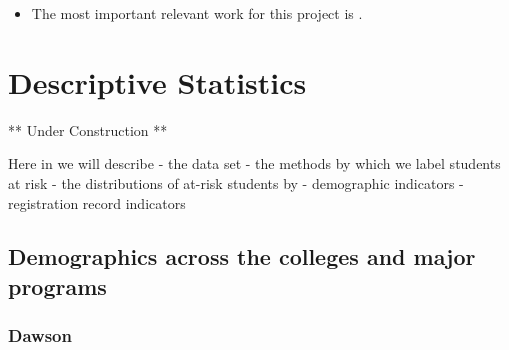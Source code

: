 \documentclass[]{book}
\providecommand{\tightlist}{%
  \setlength{\itemsep}{0pt}\setlength{\parskip}{0pt}}
\theoremstyle{definition}
\theoremstyle{definition}
\theoremstyle{remark}
\begin{document}
\begin{itemize}
\tightlist
\item
  The most important relevant work for this project is
  \citep{jorgensen2009pareafinalreport}.
\end{itemize}

\hypertarget{descriptive}{\chapter{Descriptive
Statistics}\label{descriptive}}

** Under Construction **

Here in we will describe - the data set - the methods by which we label
students at risk - the distributions of at-risk students by -
demographic indicators - registration record indicators

\section{Demographics across the colleges and major
programs}\label{demographics-across-the-colleges-and-major-programs}

\subsection{Dawson}\label{dawson}
\end{document}
